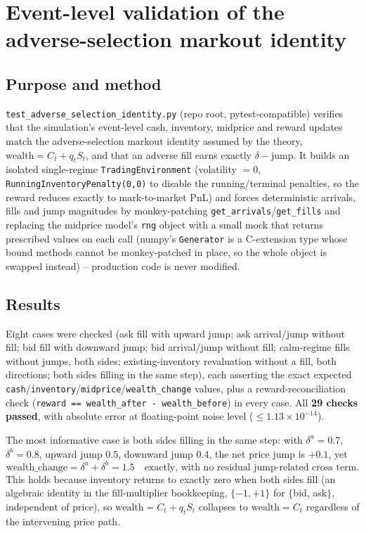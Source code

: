 \documentclass[11pt]{article}
\begin{document}
\section{Event-level validation of the adverse-selection markout identity}
\label{sec:eventlevel}

\subsection{Purpose and method}
\texttt{test\_adverse\_selection\_identity.py} (repo root, pytest-compatible) verifies that the simulation's event-level cash, inventory, midprice and reward updates match the adverse-selection markout identity assumed by the theory, $\text{wealth} = C_t + q_tS_t$, and that an adverse fill earns exactly $\delta - \text{jump}$. It builds an isolated single-regime \texttt{TradingEnvironment} (volatility $=0$, \texttt{RunningInventoryPenalty(0,0)} to disable the running/terminal penalties, so the reward reduces exactly to mark-to-market PnL) and forces deterministic arrivals, fills and jump magnitudes by monkey-patching \texttt{get\_arrivals}/\texttt{get\_fills} and replacing the midprice model's \texttt{rng} object with a small mock that returns prescribed values on each call (numpy's \texttt{Generator} is a C-extension type whose bound methods cannot be monkey-patched in place, so the whole object is swapped instead) -- production code is never modified.

\subsection{Results}
Eight cases were checked (ask fill with upward jump; ask arrival/jump without fill; bid fill with downward jump; bid arrival/jump without fill; calm-regime fills without jumps, both sides; existing-inventory revaluation without a fill, both directions; both sides filling in the same step), each asserting the exact expected \texttt{cash}/\texttt{inventory}/\texttt{midprice}/\texttt{wealth\_change} values, plus a reward-reconciliation check (\texttt{reward == wealth\_after - wealth\_before}) in every case. All \textbf{29 checks passed}, with absolute error at floating-point noise level ($\le 1.13\times10^{-14}$).

The most informative case is both sides filling in the same step: with $\delta^a=0.7$, $\delta^b=0.8$, upward jump $0.5$, downward jump $0.4$, the net price jump is $+0.1$, yet
\begin{equation}
\text{wealth\_change} = \delta^a + \delta^b = 1.5 \quad \text{exactly, with no residual jump-related cross term.}
\end{equation}
This holds because inventory returns to exactly zero when both sides fill (an algebraic identity in the fill-multiplier bookkeeping, $\{-1,+1\}$ for $\{$bid, ask$\}$, independent of price), so $\text{wealth}=C_t+q_tS_t$ collapses to $\text{wealth}=C_t$ regardless of the intervening price path.
\end{document}
